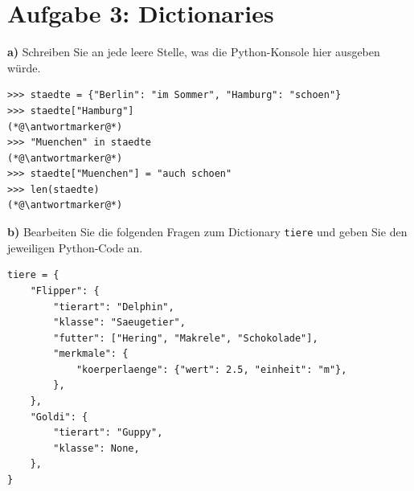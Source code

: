 \section*{Aufgabe 3: Dictionaries}

\noindent \textbf{a)} Schreiben Sie an jede leere Stelle, was die Python-Konsole hier ausgeben würde.

\begin{lstlisting}[style=python]
>>> staedte = {"Berlin": "im Sommer", "Hamburg": "schoen"}
>>> staedte["Hamburg"]
(*@\antwortmarker@*)
>>> "Muenchen" in staedte
(*@\antwortmarker@*)
>>> staedte["Muenchen"] = "auch schoen"
>>> len(staedte)
(*@\antwortmarker@*)
\end{lstlisting}


\medskip
\noindent \textbf{b)} Bearbeiten Sie die folgenden Fragen zum Dictionary \texttt{tiere} und geben Sie den jeweiligen Python-Code an.

\begin{lstlisting}[style=python]
tiere = {
    "Flipper": {
        "tierart": "Delphin",
        "klasse": "Saeugetier",
        "futter": ["Hering", "Makrele", "Schokolade"],
        "merkmale": {
            "koerperlaenge": {"wert": 2.5, "einheit": "m"},
        },
    },
    "Goldi": {
        "tierart": "Guppy",
        "klasse": None,
    },
}
\end{lstlisting}

